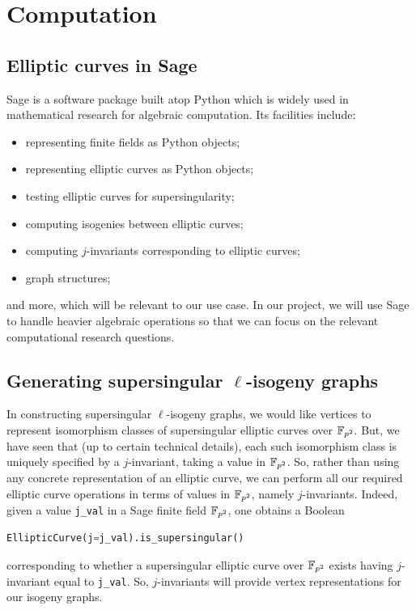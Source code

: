 \chapter{Computation}\label{ch:computation}
    \section{Elliptic curves in Sage}
        Sage is a software package built atop Python which is widely used in mathematical research for algebraic computation. Its facilities include:
        \begin{itemize}
            \item representing finite fields as Python objects;
            \item representing elliptic curves as Python objects;
            \item testing elliptic curves for supersingularity;
            \item computing isogenies between elliptic curves;
            \item computing $j$-invariants corresponding to elliptic curves;
            \item graph structures;
        \end{itemize}
        and more, which will be relevant to our use case. In our project, we will use Sage to handle heavier algebraic operations so that we can focus on the relevant computational research questions.

    \section{Generating supersingular \texorpdfstring{$\ell$}{l}-isogeny graphs}

        In constructing supersingular $\ell$-isogeny graphs, we would like vertices to represent isomorphism classes of supersingular elliptic curves over $\mathbb{F}_{p^2}$. But, we have seen that (up to certain technical details), each such isomorphism class is uniquely specified by a $j$-invariant, taking a value in $\mathbb{F}_{p^2}$. So, rather than using any concrete representation of an elliptic curve, we can perform all our required elliptic curve operations in terms of values in $\mathbb{F}_{p^2}$, namely $j$-invariants. Indeed, given a value \verb|j_val| in a Sage finite field $\mathbb{F}_{p^2}$, one obtains a Boolean
\begin{lstlisting}[language=Python]
    EllipticCurve(j=j_val).is_supersingular()
\end{lstlisting}
        corresponding to whether a supersingular elliptic curve over $\mathbb{F}_{p^2}$ exists having $j$-invariant equal to \verb|j_val|. So, $j$-invariants will provide vertex representations for our isogeny graphs.

